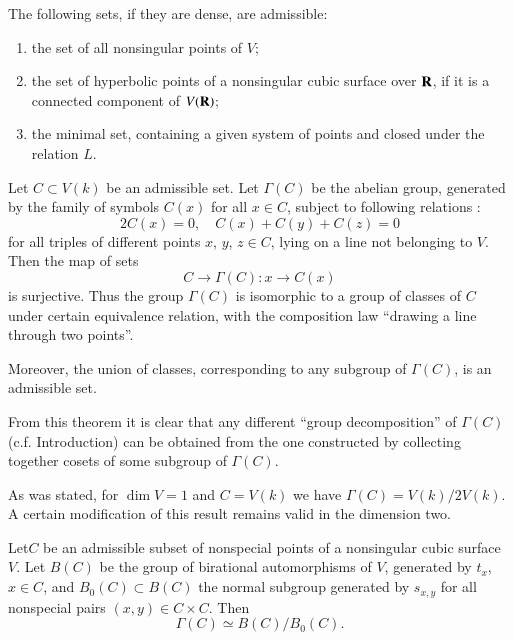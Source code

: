 The following sets, if they are dense, are admissible:
\begin{enumerate}
\item the set of all nonsingular points of $V$;

\item the set of hyperbolic points of a nonsingular cubic surface over $\mathbf{R}$, if it is a connected component of $V(\mathbf{R})$;

\item the minimal set, containing a given system of points and closed under the relation $L$.
\end{enumerate}

\begin{theorem}\label{art13-thm3}
Let $C\subset V(k)$ be an admissible set. Let $\Gamma(C)$ be the abelian group, generated by the family of symbols $C(x)$ for all $x\in C$, subject to following relations :
\begin{equation}
2C(x)=0,\quad C(x)+C(y)+C(z)=0\label{art13-eq3}
\end{equation}
for all triples of different points $x$, $y$, $z\in C$, lying on a line not belonging to $V$. Then the map of sets
$$
C\to \Gamma(C):x\to C(x)
$$
is surjective. Thus the group $\Gamma(C)$ is isomorphic to a group of classes of $C$ under certain equivalence relation, with the composition law ``drawing a line through two points''.

Moreover, the union of classes, corresponding to any subgroup of $\Gamma(C)$, is an admissible set.
\end{theorem}

From this theorem it is clear that any different ``group decomposition'' of $\Gamma(C)$ (c.f. Introduction) can be obtained from the one constructed by collecting together cosets of some subgroup of $\Gamma(C)$. 

As was stated, for $\dim V=1$ and $C=V(k)$ we have $\Gamma(C)=V(k)/2V(k)$. A certain modification of this result remains valid in the dimension two.

\begin{theorem}\label{art13-thm4}
Let\pageoriginale $C$ be an admissible subset of nonspecial points of a nonsingular cubic surface $V$. Let $B(C)$ be the group of birational automorphisms of $V$, generated by $t_{x}$, $x\in C$, and $B_{0}(C)\subset B(C)$ the normal subgroup generated by $s_{x,y}$ for all nonspecial pairs $(x,y)\in C\times C$. Then
$$
\Gamma(C)\simeq B(C)/B_{0}(C).
$$
\end{theorem}

